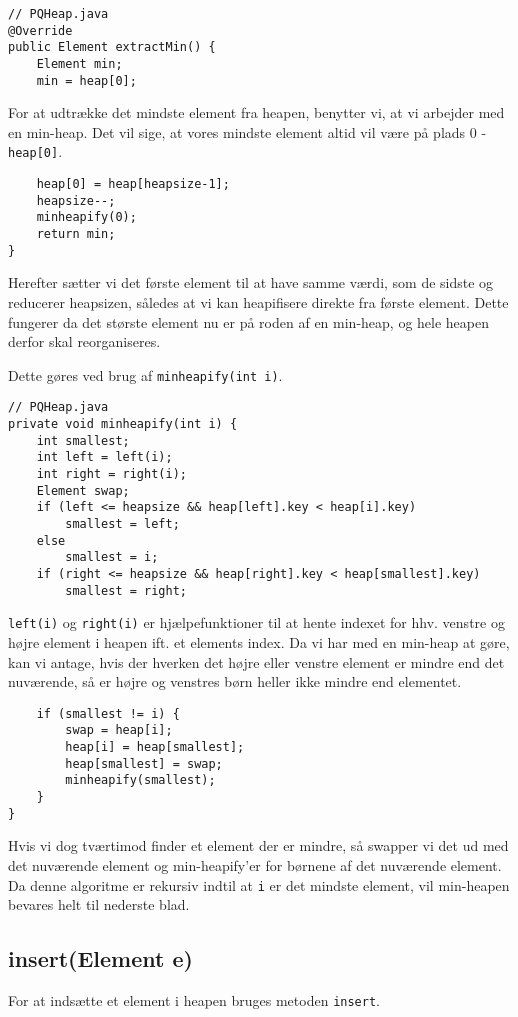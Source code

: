 \documentclass{article}
\begin{document}
\begin{lstlisting}
// PQHeap.java
@Override
public Element extractMin() {
    Element min;
    min = heap[0];    
\end{lstlisting}
For at udtrække det mindste element fra heapen, benytter vi, at vi arbejder med en min-heap. Det vil sige, at vores mindste element altid vil være på plads 0 - \texttt{heap[0]}.
\begin{lstlisting}    
    heap[0] = heap[heapsize-1];
    heapsize--;
    minheapify(0);
    return min;
}
\end{lstlisting}
Herefter sætter vi det første element til at have samme værdi, som de sidste og reducerer heapsizen, således at vi kan heapifisere direkte fra første element. Dette fungerer da det største element nu er på roden af en min-heap, og hele heapen derfor skal reorganiseres. \newline

\noindent Dette gøres ved brug af \texttt{minheapify(int i)}.
\begin{lstlisting}
// PQHeap.java
private void minheapify(int i) {
    int smallest;
    int left = left(i);
    int right = right(i);
    Element swap;
    if (left <= heapsize && heap[left].key < heap[i].key)
        smallest = left;
    else
        smallest = i;
    if (right <= heapsize && heap[right].key < heap[smallest].key)
        smallest = right;
\end{lstlisting}
\texttt{left(i)} og \texttt{right(i)} er hjælpefunktioner til at hente indexet for hhv. venstre og højre element i heapen ift. et elements index.
Da vi har med en min-heap at gøre, kan vi antage, hvis der hverken det højre eller venstre element er mindre end det nuværende, så er højre og venstres børn heller ikke mindre end elementet.
\begin{lstlisting}
    if (smallest != i) {
        swap = heap[i];
        heap[i] = heap[smallest];
        heap[smallest] = swap;
        minheapify(smallest);
    }
}
\end{lstlisting}
 Hvis vi dog tværtimod finder et element der er mindre, så swapper vi det ud med det nuværende element og min-heapify'er for børnene af det nuværende element. Da denne algoritme er rekursiv indtil at \texttt{i} er det mindste element, vil min-heapen bevares helt til nederste blad.
 
\subsection*{insert(Element e)}
For at indsætte et element i heapen bruges metoden \texttt{insert}.
\end{document}
